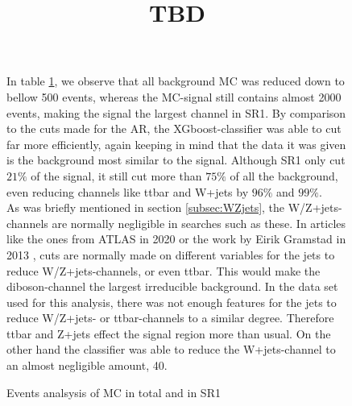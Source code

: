 \documentclass{article}
\begin{document}
\begin{figure}
\bgroup
In table \ref{table:SR1_R}, we observe that all background MC was reduced down to bellow 500 events, whereas the MC-signal still contains almost 2000 events, making the signal the largest channel in SR1. By comparison to the cuts made for the AR, the XGboost-classifier was able to cut far more efficiently, again keeping in mind that the data it was given is the background most similar to the signal. Although SR1 only cut $21\%$ of the signal, it still cut more than $75\%$ of all the background, even reducing channels like ttbar and W+jets by $96\%$ and $99\%$.
\\
As was briefly mentioned in section \ref{subsec:WZjets}, the W/Z+jets-channels are normally negligible in searches such as these.  In articles like the ones from ATLAS in 2020 \cite{Aad_2020} or the work by Eirik Gramstad in 2013 \cite{Gramstad:2013loc}, cuts are normally made on different variables for the jets to reduce W/Z+jets-channels, or even ttbar. This would make the diboson-channel the largest irreducible background. In the data set used for this analysis, there was not enough features for the jets to reduce W/Z+jets- or ttbar-channels to a similar degree. Therefore ttbar and Z+jets effect the signal region more than usual. On the other hand the classifier was able to reduce the W+jets-channel to an almost negligible amount, 40.
\title{TBD}
{\tabcolsep=20pt
\begin{table}
    \caption{Events analsysis of MC in total and in SR1}
    \centering 
    \begin{threeparttable}
    \end{threeparttable}
    \label{table:SR1_R}
\end{table}
}
\egroup
\end{figure}
\end{document}
